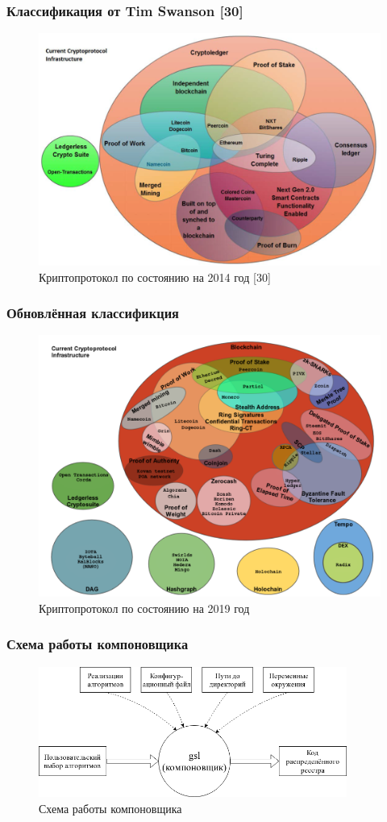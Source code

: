 \documentclass{beamer}
\begin{document}
\begin{frame}
    \frametitle{Классификация от Tim Swanson [30]}
    \begin{figure}
        \includegraphics[width=0.9\columnwidth]{current_protocols}
        \caption{Криптопротокол по состоянию на 2014 год [30]}
    \end{figure}
\end{frame}

\begin{frame}
    \frametitle{Обновлённая классификция}
    \begin{figure}
        \centering
        \includegraphics[width=0.8\columnwidth]{myprotocol_w_title}
        \caption{Криптопротокол по состоянию на 2019 год}
    \end{figure}
\end{frame}

\begin{frame}
    \frametitle{Схема работы компоновщика}
    \begin{figure}
        \centering
        \includegraphics[width=0.9\textwidth]{komponovshik}
        \caption{\small Схема работы компоновщика}
    \end{figure}
\end{frame}
\end{document}
